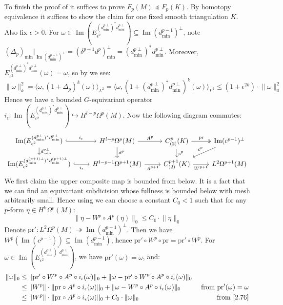 \documentclass[11pt]{report}
\theoremstyle{definition}
\theoremstyle{plain}
\DeclareMathOperator{\im}{Im}
\newcommand{\inj}{\hookrightarrow}
\newcommand{\brac}[1]{\langle #1 \rangle}
\newcommand{\norm}[1]{\lVert #1 \rVert}
\begin{document}
To finish the proof of  it suffices to prove $F_p(M)\preceq F_p(K)$. By homotopy equivalence it suffices to show the claim for one fixed smooth triangulation $K$. Also fix $\epsilon>0$. For $\omega\in \im(E^{(d^{p\perp}_{\min})^*d^{p\perp}_{\min}}_{\epsilon^2})\subseteq \im(d^{p-1}_{\min})^\perp$, note  $(\Delta_p)_{\min}|_{\im(d^{p-1}_{\min})^\perp}=(\delta^{p+1}d^p)^\perp_{\min}=(d^{p\perp}_{\min})^*d^{p\perp}_{\min}$. Moreover, $E^{(d^{p\perp}_{\min})^*d^{p\perp}_{\min}}_{\epsilon^2}(\omega)=\omega$, so by  we see:
\begin{equation}
\norm{\omega}^2_k=\brac{\omega, (1+\Delta_p)^k(\omega)}_{L^2}=\brac{\omega, (1+(d^{p\perp}_{\min})^*d^{p\perp}_{\min})^k(\omega)}_{L^2}\leq (1+\epsilon^{2k})\cdot \norm{\omega}^2_0
\end{equation}
Hence we have a bounded $G$-equivariant operator $i_\epsilon:\im(E^{(d^{p\perp}_{\min})^*d^{p\perp}_{\min}}_{\epsilon^2})\inj H^{l-p}\Omega^p(M)$. Now the following diagram commutes:
\begin{equation}
\begin{tikzcd}[row sep=small]
\im(E^{(d^{p\perp}_{\min})^*d^{p\perp}_{\min}}_{\epsilon^2})\rar[hook]{i_{\epsilon}} \dar{d^{p\perp}_{\min}} &H^{l-p}\Omega^p(M)\rar{A^p} \dar{d^p} &C^p_{(2)}(K)\dar{c^p} \rar[two heads]{\mathrm{pr}}&\im(c^{p-1})^\perp\arrow[dl, swap,"c^p"]\\
\im(E^{(d^{(p+1)\perp}_{\min})^*d^{(p+1)\perp}_{\min}}_{\epsilon^2})\rar[hook,swap]{i_\epsilon} &H^{l-p-1}\Omega^{p+1}(M)\rar[swap]{A^{p+1}} &C^{p+1}_{(2)}(K) \rar[swap]{W^{p+1}} &L^2\Omega^{p+1}(M)
\end{tikzcd}
\end{equation}
We first claim the upper composite map is bounded from below. It is a fact that we can find an equivariant subdicision whose fullness is bounded below with mesh arbitrarily small. Hence using  we can choose a constant $C_0<1$ such that for any $p$-form $\eta\in H^k\Omega^p(M)$:
\begin{equation*}
\norm{\eta-W^p\circ A^p(\eta)}_0\leq C_0\cdot \norm{\eta}_0
\end{equation*}
Denote $\mathrm{pr}':L^2\Omega^p(M)\twoheadrightarrow \im(d^{p-1}_{\min})^\perp$. Then we have $W^p(\im(c^{p-1}))\subseteq \im(d^{p-1}_{\min})$, hence $\mathrm{pr}'\circ W^p\circ \mathrm{pr}=\mathrm{pr}'\circ W^p$. For $\omega\in \im(E^{(d^{p\perp}_{\min})^*d^{p\perp}_{\min}}_{\epsilon^2})$, we have $\mathrm{pr}'(\omega)=\omega$, and:
\begin{align*}
\norm{\omega}_0&\leq \norm{\mathrm{pr}'\circ W^p\circ A^p\circ i_\epsilon(\omega)}_0+\norm{\omega-\mathrm{pr}'\circ W^p\circ A^p\circ i_{\epsilon}(\omega)}_0\\
&\leq \norm{W^p}\cdot \norm{\mathrm{pr}\circ A^p\circ i_{\epsilon}(\omega)}_0+\norm{\omega-W^p\circ A^p\circ i_\epsilon(\omega)}_0\qquad &\text{from $\mathrm{pr}'(\omega)=\omega$}\\
&\leq \norm{W^p}\cdot \norm{\mathrm{pr}\circ A^p\circ i_{\epsilon}(\omega)}_0+C_0\cdot \norm{\omega}_0\qquad &\text{from \Cref{2.76}}
\end{align*}
\end{document}
